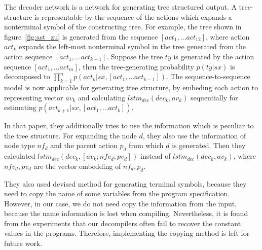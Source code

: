 \documentclass[senior,final,11pt]{iscs-thesis}
\begin{document}
The decoder network is a network for generating tree structured output. 
A tree-structure is representable by the sequence of the actions which expands a nonterminal symbol of the constructing tree.
For example, the tree shown in figure~\ref{fig:ast_zu} is generated from the sequence $ [act_1, \dots act_{12}] $, 
where action $ act_k $ expands the left-most nonterminal symbol in the tree generated from the action sequence $ [act_1, \dots act_{k-1}] $. 
Suppose the tree $ty$ is generated by the action sequence $ [act_1, \dots act_m] $, 
then the tree-generating probability $ p(ty|sx) $ is decomposed to $ \prod_{k=1}^n p(act_k|sx,[act_1, \dots act_{k-1}]) $. 
The sequence-to-sequence model is now applicable for generating tree structure, by embeding each action to representing vector $av_k$ and 
calculating $ lstm_{dec}(dec_{k},av_{k}) $ sequentially for estimating $p(act_{k+1}|sx,[act_1, \dots act_{k}]) $.  


In that paper, they additionally tries to use the information which is peculiar to the tree structure. 
For expanding the node $d$, they also use the information of node type $ nf_{d} $ and the parent action $p_{d}$ from which $d$ is generated.
Then they calculated $ lstm_{dec}(dec_{k},[av_{k}; nfv_{d}; pv_{d}]) $ instead of $ lstm_{dec}(dec_{k},av_{k}) $, 
where $nfv_{d},pv_{d}$ are the vector embedding of $nf_{d},p_{d}$.

They also used devised method for generating terminal symbols, because they need to copy the name of some variables from the program specification.
However, in our case, we do not need copy the information from the input, because the name information is lost when compiling.
Nevertheless, it is found from the experiments that our decompilers often fail to recover the constant values in the programs.
Therefore, implementing the copying method is left for future work.


\end{document}
